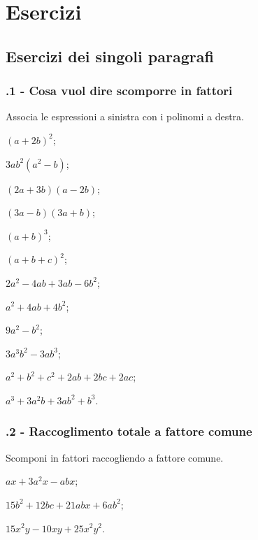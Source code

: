 \section{Esercizi}
\subsection{Esercizi dei singoli paragrafi}
\subsubsection*{\thechapter.1 - Cosa vuol dire scomporre in fattori}

\begin{esercizio}
\label{ese:15.1}
Associa le espressioni a sinistra con i polinomi a destra.
  \begin{multicols}{2}
\begin{enumeratea}
\item $(a+2b)^{2}$;
\item $3ab^{2}(a^{2}-b)$;
\item $(2a+3b)(a-2b)$;
\item $(3a-b)(3a+b)$;
\item $(a+b)^{3}$;
\item $(a+b+c)^{2}$;
\item $2a^{2}-4ab+3ab-6b^{2}$;
\item $a^{2}+4ab+4b^{2}$;
\item $9a^{2}-b^{2}$;
\item $3a^{3}b^{2}-3ab^{3}$;
\item $a^{2}+b^{2}+c^{2}+2ab+2bc+2ac$;
\item $a^{3}+3a^{2}b+3ab^{2}+b^{3}$.
\end{enumeratea}
  \end{multicols}
\end{esercizio}

\subsubsection*{\thechapter.2 - Raccoglimento totale a fattore comune}

\begin{esercizio}[\Ast]
\label{ese:15.2}
Scomponi in fattori raccogliendo a fattore comune.
\begin{multicols}{2}
\begin{enumeratea}
 \item $ax+3a^{2}x-abx$;
 \item $15b^{2}+12bc+21abx+6ab^{2}$;
 \item $15x^{2}y-10xy+25x^{2}y^{2}$.
\end{enumeratea}
\end{multicols}
\end{esercizio}

